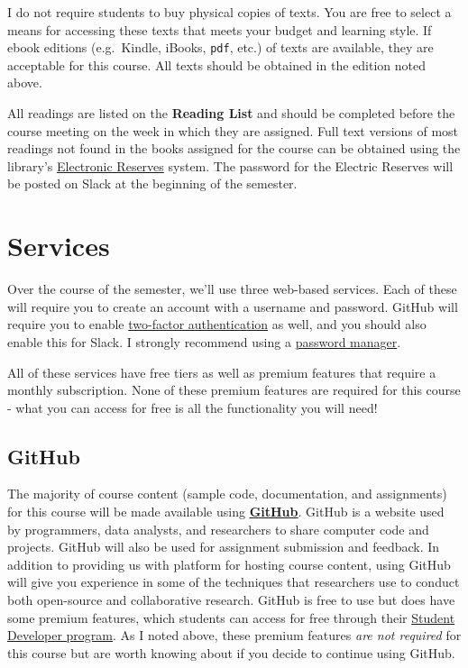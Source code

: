 \documentclass[]{book}
\theoremstyle{definition}
\theoremstyle{definition}
\theoremstyle{definition}
\theoremstyle{remark}
\begin{document}
I do not require students to buy physical copies of texts. You are free
to select a means for accessing these texts that meets your budget and
learning style. If ebook editions (e.g.~Kindle, iBooks, \texttt{pdf},
etc.) of texts are available, they are acceptable for this course. All
texts should be obtained in the edition noted above.

All readings are listed on the \textbf{Reading List} and should be
completed before the course meeting on the week in which they are
assigned. Full text versions of most readings not found in the books
assigned for the course can be obtained using the library's
\href{http://eres.slu.edu/eres/coursepass.aspx?cid=4487}{Electronic
Reserves} system. The password for the Electric Reserves will be posted
on Slack at the beginning of the semester.

\section{Services}\label{services}

Over the course of the semester, we'll use three web-based services.
Each of these will require you to create an account with a username and
password. GitHub will require you to enable
\href{https://en.wikipedia.org/wiki/Multi-factor_authentication}{two-factor
authentication} as well, and you should also enable this for Slack. I
strongly recommend using a
\href{https://lifehacker.com/5529133/five-best-password-managers}{password
manager}.

All of these services have free tiers as well as premium features that
require a monthly subscription. None of these premium features are
required for this course - what you can access for free is all the
functionality you will need!

\subsection{GitHub}\label{github}

The majority of course content (sample code, documentation, and
assignments) for this course will be made available using
\textbf{\href{http://www.github.com}{GitHub}}. GitHub is a website used
by programmers, data analysts, and researchers to share computer code
and projects. GitHub will also be used for assignment submission and
feedback. In addition to providing us with platform for hosting course
content, using GitHub will give you experience in some of the techniques
that researchers use to conduct both open-source and collaborative
research. GitHub is free to use but does have some premium features,
which students can access for free through their
\href{https://education.github.com/pack/}{Student Developer program}. As
I noted above, these premium features \emph{are not required} for this
course but are worth knowing about if you decide to continue using
GitHub.
\end{document}
